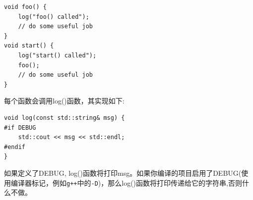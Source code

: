 \begin{lstlisting}[caption={}]
void foo() {
	log("foo() called");
	// do some useful job
}
void start() {
	log("start() called");
	foo();
	// do some useful job
}
\end{lstlisting}

每个函数会调用log()函数，其实现如下: \par

\begin{lstlisting}[caption={}]
void log(const std::string& msg) {
#if DEBUG
	std::cout << msg << std::endl;
#endif
}
\end{lstlisting}

如果定义了DEBUG, log()函数将打印msg。如果你编译的项目启用了DEBUG(使用编译器标记，例如\texttt{g++}中的\texttt{-D})，那么log()函数将打印传递给它的字符串,否则什么不做。 \par



























